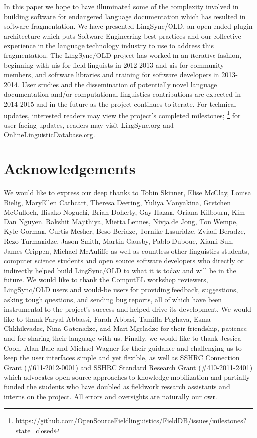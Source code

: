 \documentclass[11pt]{article}
\begin{document}
In this paper we hope to have illuminated some of the complexity involved in
building software for endangered language documentation which has resulted in software
fragmentation. We have presented LingSync/OLD,  an open-ended plugin
architecture which puts Software Engineering best practices and our collective
experience in the language technology industry  to use to address this
fragmentation. The LingSync/OLD project has worked in an iterative fashion,
beginning with \glspl{ui} for field linguists in 2012-2013 and \glspl{ui} for 
community members, and software libraries and training for software
developers in 2013-2014. User studies and the dissemination of potentially
novel language documentation and/or computational linguistics contributions are
expected in 2014-2015 and in the future as the project continues to iterate.
For technical updates, interested readers may view the project's completed
milestones;%
\footnote{\url{https://github.com/OpenSourceFieldlinguistics/FieldDB/issues/milestones?state=closed}} %
for user-facing updates, readers may visit LingSync.org and
OnlineLinguisticDatabase.org.


\section*{Acknowledgements}

We would like to express our deep thanks to Tobin Skinner, Elise McClay, Louisa
Bielig, MaryEllen Cathcart, Theresa Deering, Yuliya Manyakina, Gretchen
McCulloch, Hisako Noguchi, Brian Doherty, Gay Hazan, Oriana Kilbourn, Kim Dan
Nguyen, Rakshit Majithiya, Mietta Lennes, Nivja de Jong, Ton Wempe, Kyle
Gorman, Curtis Mesher, Beso Beridze, Tornike Lasuridze, Zviadi Beradze, Rezo
Turmanidze, Jason Smith, Martin Gausby, Pablo Duboue, Xianli Sun, James Crippen,
Michael McAuliffe as well as countless other linguistics students, computer
science students and open source software developers who directly or indirectly
helped build LingSync/OLD to what it is today and will be in the future. We
would like to thank the ComputEL workshop reviewers, LingSync/OLD users and
would-be users for providing feedback, suggestions, asking tough questions, and
sending bug reports, all of which have been instrumental to the project's
success and helped drive its development. We would like to thank Faryal
Abbassi, Farah Abbasi, Tamilla Paghava, Esma Chkhikvadze, Nina Gatenadze, and
Mari Mgeladze for their friendship, patience and for sharing their language
with us.  Finally, we would like to thank Jessica Coon, Alan Bale and Michael
Wagner for their guidance and challenging us to keep the user interfaces simple
and yet flexible, as well as SSHRC Connection Grant (\#611-2012-0001) and SSHRC
Standard Research Grant (\#410-2011-2401) which advocates open source
approaches to knowledge mobilization and partially funded the students who have
doubled as fieldwork research assistants and interns on the project. All errors
and oversights are naturally our own.




\end{document}
